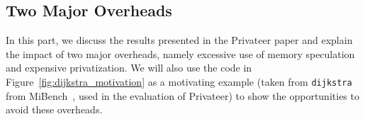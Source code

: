 \subsection{Two Major Overheads}
In this part, we discuss the results presented in the Privateer paper and
explain the impact of two major overheads, namely excessive use of memory
speculation and expensive privatization. We will also use the code in
Figure~\ref{fig:dijkstra_motivation} as a motivating example (taken from
\texttt{dijkstra} from MiBench~\cite{}, used in the evaluation of
Privateer) to show the opportunities to avoid these overheads.

